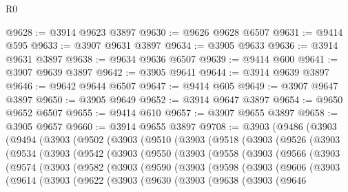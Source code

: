 \begin{lexlean}{R0}
\begin{coremodule}
@9628 := @3914 @9623 @3897
@9630 := @9626 @9628 @6507
@9631 := @9414 @595
@9633 := @3907 @9631 @3897
@9634 := @3905 @9633
@9636 := @3914 @9631 @3897
@9638 := @9634 @9636 @6507
@9639 := @9414 @600
@9641 := @3907 @9639 @3897
@9642 := @3905 @9641
@9644 := @3914 @9639 @3897
@9646 := @9642 @9644 @6507
@9647 := @9414 @605
@9649 := @3907 @9647 @3897
@9650 := @3905 @9649
@9652 := @3914 @9647 @3897
@9654 := @9650 @9652 @6507
@9655 := @9414 @610
@9657 := @3907 @9655 @3897
@9658 := @3905 @9657
@9660 := @3914 @9655 @3897
@9708 := @3903
    (@9486
      (@3903
        (@9494
          (@3903
            (@9502
              (@3903
                (@9510
                  (@3903
                    (@9518
                      (@3903
                        (@9526
                          (@3903
                            (@9534
                              (@3903
                                (@9542
                                  (@3903
                                    (@9550
                                      (@3903
                                        (@9558
                                          (@3903
                                            (@9566
                                              (@3903
                                                (@9574
                                                  (@3903
                                                    (@9582
                                                      (@3903
                                                        (@9590
                                                          (@3903
                                                            (@9598
                                                              (@3903
                                                                (@9606
                                                                  (@3903
                                                                    (@9614
                                                                      (@3903
                                                                        (@9622
                                                                          (@3903
                                                                            (@9630
                                                                              (@3903
                                                                                (@9638
                                                                                  (@3903
                                                                                    (@9646

\end{coremodule}
\end{lexlean}
